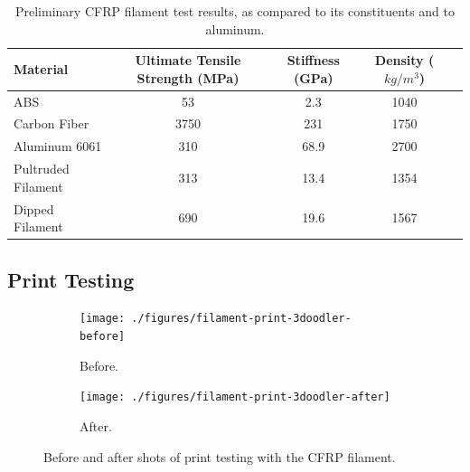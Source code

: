 \begin{table}[h]
    \centering
    \begin{tabular}{lcccc}
        Material           & Ultimate Tensile Strength (MPa)   & Stiffness (GPa)    & Density ($ kg/m^{3} $)  \\ \hline
        ABS                & 53                                & 2.3                & 1040 \\
        Carbon Fiber       & 3750                              & 231                & 1750 \\
        Aluminum 6061      & 310                               & 68.9               & 2700 \\
        Pultruded Filament & 313                               & 13.4               & 1354 \\ 
        Dipped Filament    & 690                               & 19.6               & 1567 \\
    \end{tabular}
    \caption{Preliminary CFRP filament test results, as compared to its constituents and to aluminum.}
    \label{tab:test-results}
\end{table}

\clearpage

\subsection{Print Testing}

\indent

\begin{figure}[h!]
        \centering
        \begin{subfigure}[b]{0.45\textwidth}
                \texttt{[image: ./figures/filament-print-3doodler-before]}
                \caption{Before.}
                \label{fig:filament-print-3doodler-before}
        \end{subfigure}
        \begin{subfigure}[b]{0.45\textwidth}
                \texttt{[image: ./figures/filament-print-3doodler-after]}
                \caption{After.}
                \label{fig:filament-print-3doodler-after}
        \end{subfigure}
        \caption{Before and after shots of print testing with the CFRP filament.}\label{fig:filament-print-test}
\end{figure}

